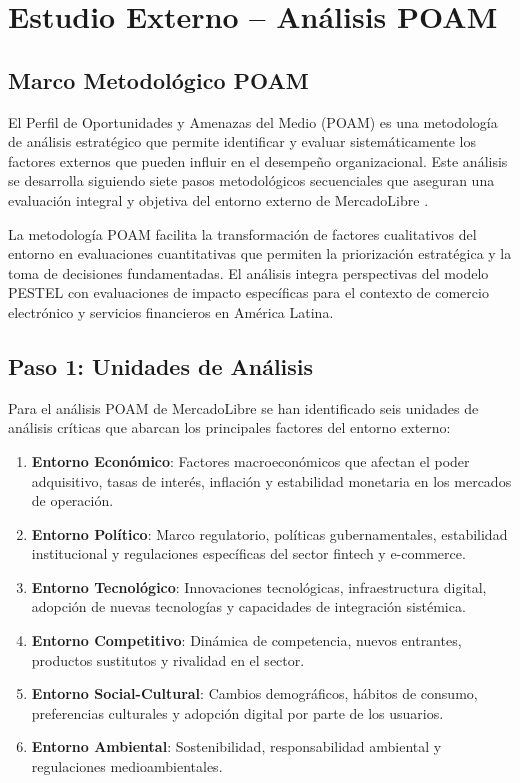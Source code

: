 \section{Estudio Externo -- Análisis POAM}
\label{sec:estudio_externo}

\subsection{Marco Metodológico POAM}

El Perfil de Oportunidades y Amenazas del Medio (POAM) es una metodología de análisis estratégico que permite identificar y evaluar sistemáticamente los factores externos que pueden influir en el desempeño organizacional. Este análisis se desarrolla siguiendo siete pasos metodológicos secuenciales que aseguran una evaluación integral y objetiva del entorno externo de MercadoLibre \autocite{david2017}.

La metodología POAM facilita la transformación de factores cualitativos del entorno en evaluaciones cuantitativas que permiten la priorización estratégica y la toma de decisiones fundamentadas. El análisis integra perspectivas del modelo PESTEL con evaluaciones de impacto específicas para el contexto de comercio electrónico y servicios financieros en América Latina.

\subsection{Paso 1: Unidades de Análisis}

Para el análisis POAM de MercadoLibre se han identificado seis unidades de análisis críticas que abarcan los principales factores del entorno externo:

\begin{enumerate}
\item \textbf{Entorno Económico}: Factores macroeconómicos que afectan el poder adquisitivo, tasas de interés, inflación y estabilidad monetaria en los mercados de operación.
\item \textbf{Entorno Político}: Marco regulatorio, políticas gubernamentales, estabilidad institucional y regulaciones específicas del sector fintech y e-commerce.
\item \textbf{Entorno Tecnológico}: Innovaciones tecnológicas, infraestructura digital, adopción de nuevas tecnologías y capacidades de integración sistémica.
\item \textbf{Entorno Competitivo}: Dinámica de competencia, nuevos entrantes, productos sustitutos y rivalidad en el sector.
\item \textbf{Entorno Social-Cultural}: Cambios demográficos, hábitos de consumo, preferencias culturales y adopción digital por parte de los usuarios.
\item \textbf{Entorno Ambiental}: Sostenibilidad, responsabilidad ambiental y regulaciones medioambientales.
\end{enumerate}

